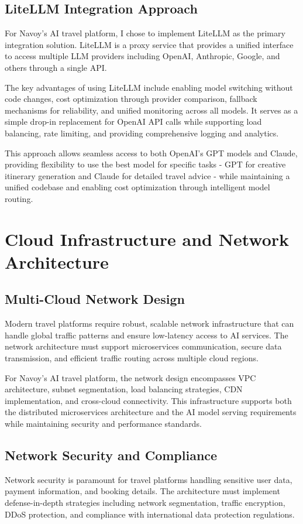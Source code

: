 \subsection{LiteLLM Integration Approach}
For Navoy's AI travel platform, I chose to implement LiteLLM as the primary integration solution. LiteLLM is a proxy service that provides a unified interface to access multiple LLM providers including OpenAI, Anthropic, Google, and others through a single API.

The key advantages of using LiteLLM include enabling model switching without code changes, cost optimization through provider comparison, fallback mechanisms for reliability, and unified monitoring across all models. It serves as a simple drop-in replacement for OpenAI API calls while supporting load balancing, rate limiting, and providing comprehensive logging and analytics.

This approach allows seamless access to both OpenAI's GPT models and Claude, providing flexibility to use the best model for specific tasks - GPT for creative itinerary generation and Claude for detailed travel advice - while maintaining a unified codebase and enabling cost optimization through intelligent model routing.

\section{Cloud Infrastructure and Network Architecture}

\subsection{Multi-Cloud Network Design}
Modern travel platforms require robust, scalable network infrastructure that can handle global traffic patterns and ensure low-latency access to AI services. The network architecture must support microservices communication, secure data transmission, and efficient traffic routing across multiple cloud regions.

For Navoy's AI travel platform, the network design encompasses VPC architecture, subnet segmentation, load balancing strategies, CDN implementation, and cross-cloud connectivity. This infrastructure supports both the distributed microservices architecture and the AI model serving requirements while maintaining security and performance standards.

\subsection{Network Security and Compliance}
Network security is paramount for travel platforms handling sensitive user data, payment information, and booking details. The architecture must implement defense-in-depth strategies including network segmentation, traffic encryption, DDoS protection, and compliance with international data protection regulations.

